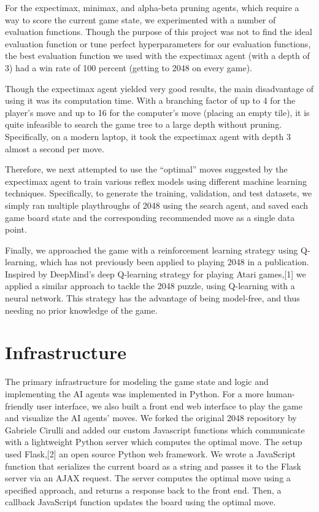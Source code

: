 \documentclass[9pt,twocolumn]{article}
\begin{document}
For the expectimax, minimax, and alpha-beta pruning agents, which require a way to score the current game state, we experimented with a number of evaluation functions. Though the purpose of this project was not to find the ideal evaluation function or tune perfect hyperparameters for our evaluation functions, the best evaluation function we used with the expectimax agent (with a depth of 3) had a win rate of 100 percent (getting to 2048 on every game).

Though the expectimax agent yielded very good results, the main disadvantage of using it was its computation time. With a branching factor of up to 4 for the player’s move and up to 16 for the computer’s move (placing an empty tile), it is quite infeasible to search the game tree to a large depth without pruning. Specifically, on a modern laptop, it took the expectimax agent with depth 3 almost a second per move.

Therefore, we next attempted to use the “optimal” moves suggested by the expectimax agent to train various reflex models using different machine learning techniques. Specifically, to generate the training, validation, and test datasets, we simply ran multiple playthroughs of 2048 using the search agent, and saved each game board state and the corresponding recommended move as a single data point.

Finally, we approached the game with a reinforcement learning strategy using Q-learning, which has not previously been applied to playing 2048 in a publication. Inspired by DeepMind's deep Q-learning strategy for playing Atari games,[1] we applied a similar approach to tackle the 2048 puzzle, using Q-learning with a neural network. This strategy has the advantage of being model-free, and thus needing no prior knowledge of the game.

\section{Infrastructure}

The primary infrastructure for modeling the game state and logic and implementing the AI agents was implemented in Python. For a more human-friendly user interface, we also built a front end web interface to play the game and visualize the AI agents' moves. We forked the original 2048 repository by Gabriele Cirulli and added our custom Javascript functions which communicate with a lightweight Python server which computes the optimal move. The setup used Flask,[2] an open source Python web framework. We wrote a JavaScript function that serializes the current board as a string and passes it to the Flask server via an AJAX request. The server computes the optimal move using a specified approach, and returns a response back to the front end. Then, a callback JavaScript function updates the board using the optimal move.
\end{document}
